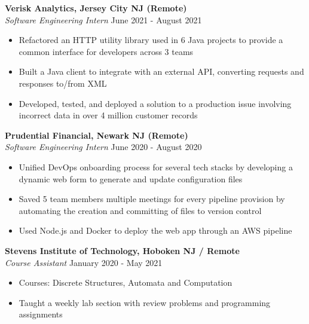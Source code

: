 \documentclass{article}
\begin{document}
\noindent
\textbf{Verisk Analytics, Jersey City NJ (Remote)}\\
\textit{Software Engineering Intern}
\hfill
June 2021 - August 2021\\
\vspace{-1em}
\begin{itemize}
\item Refactored an HTTP utility library used in 6 Java projects to provide a common interface for developers across 3 teams
\item Built a Java client to integrate with an external API, converting requests and responses to/from XML
\item Developed, tested, and deployed a solution to a production issue involving incorrect data in over 4 million customer records



\end{itemize}

\noindent
\textbf{Prudential Financial, Newark NJ (Remote)}\\
\textit{Software Engineering Intern}
\hfill
June 2020 - August 2020\\
\vspace{-1em}
\begin{itemize}
\item Unified DevOps onboarding process for several tech stacks by developing a dynamic web form to generate and update configuration files
\item Saved 5 team members multiple meetings for every pipeline provision by automating the creation and committing of files to version control
\item Used Node.js and Docker to deploy the web app through an AWS pipeline
\end{itemize}

\noindent
\textbf{Stevens Institute of Technology, Hoboken NJ / Remote}\\
\textit{Course Assistant}
\hfill
January 2020 - May 2021\\
\vspace{-1em}
\begin{itemize}
\item Courses: Discrete Structures, Automata and Computation
\item Taught a weekly lab section with review problems and programming assignments
\end{itemize}
\end{document}
